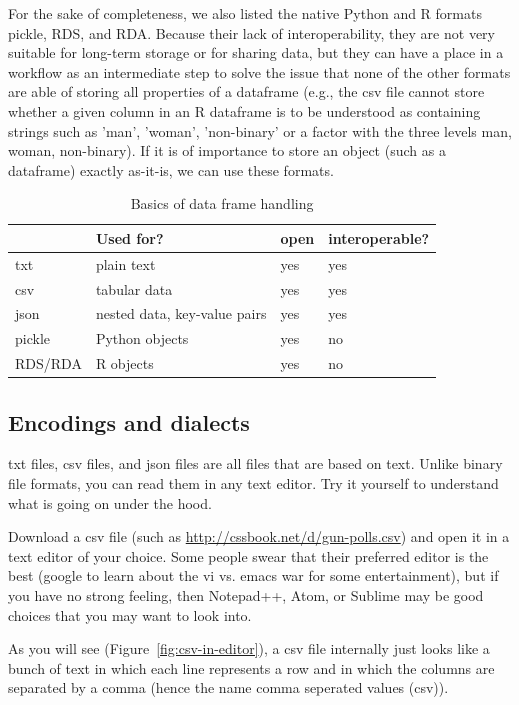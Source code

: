 For the sake of completeness, we also listed the native Python and R formats pickle, RDS, and RDA. Because their lack of interoperability, they are not very suitable for long-term storage or for sharing data, but they can have a place in a workflow as an intermediate step to solve the issue that none of the other formats are able of storing all properties of a dataframe (e.g., the csv file cannot store whether a given column in an R dataframe is to be understood as containing strings such as 'man', 'woman', 'non-binary' or a factor with the three levels man, woman, non-binary). If it is of importance to store an object (such as a dataframe) exactly as-it-is, we can use these formats. 

\begin{table}[]
\caption{Basics of data frame handling \label{tab:fileformats}}{%
\begin{tabular}{@{}llll@{}}
\toprule
        & Used for?             & open   & interoperable?\\ \midrule
txt     & plain text            &yes & yes            \\
csv     & tabular data          & yes & yes            \\
json    & nested data, key-value pairs   & yes & yes             \\ 
pickle  & Python objects        & yes & no     \\ 
RDS/RDA & R objects             & yes & no \\ \bottomrule
\end{tabular}}{}
\end{table}


\subsection{Encodings and dialects}
\label{sec:encodings}
txt files, csv files, and json files are all files that are based on text. Unlike binary file formats, you can read them in any text editor. Try it yourself to understand what is going on under the hood. 

Download a csv file (such as \url{http://cssbook.net/d/gun-polls.csv})
and open it in a text editor of your choice. Some people swear that their preferred editor is the best (google to learn about the vi vs. emacs war for some entertainment), but if you have no strong feeling, then Notepad++, Atom, or Sublime may be good choices that you may want to look into.

As you will see (Figure~\ref{fig:csv-in-editor}), a csv file internally just looks like a bunch of text in which each line represents a row and in which the columns are separated by a comma (hence the name comma seperated values (csv)).

